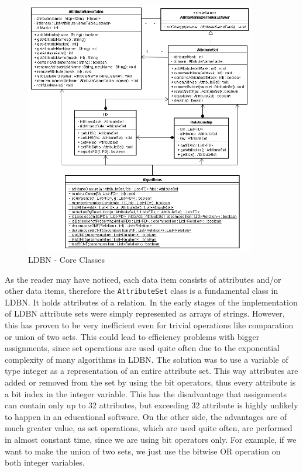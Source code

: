 \begin{figure}[h]
	\begin{center}
		\includegraphics[width=0.9\textwidth]{./img/uml02.png}
		\caption{LDBN - Core Classes}
		\label{fig:coreuml}
	\end{center}
\end{figure}

As the reader may have noticed, each data item consists of attributes and/or other
data items, therefore the \verb=AttributeSet= class is a fundamental class in LDBN. 
It holds attributes of a relation. 
In the early stages of the implementation of LDBN attribute sets
were simply represented as arrays of strings. However, this has proven to be very
inefficient even for trivial operations like comparation or union of two sets. This could 
lead to efficiency problems with
bigger assignments, since set operations are used quite often due to the exponential
complexity of many algorithms in LDBN.
The solution was to use a variable of type integer as a representation of an entire
attribute set. 
This way attributes are added or removed from the set by using the bit operators, 
thus every attribute is 
a bit index in the integer variable. This has the disadvantage that
assignments can contain only up to 32 attributes, but exceeding 32 attribute 
is highly unlikely to happen in an educational software. On the other side, the 
advantages are of much greater value, as set operations, which are used quite 
often, are performed in almost constant time, since we are using bit operators only.
For example, if we want to make the union of two sets, we just use the 
bitwise OR operation on both integer variables.
 
